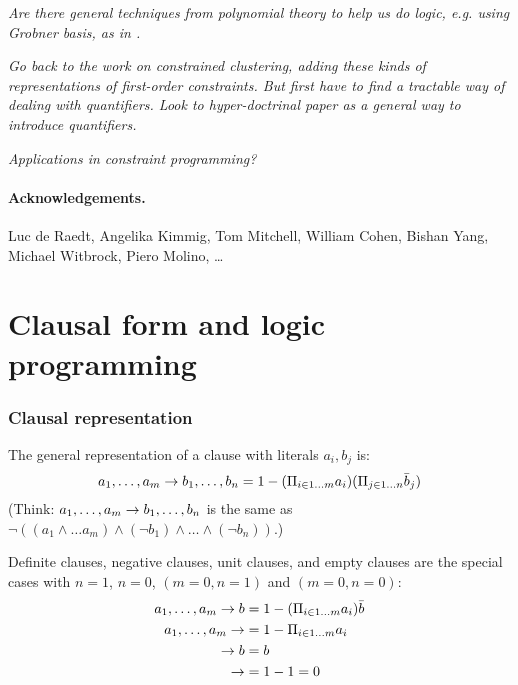 \documentclass{article} %
\begin{document}
{\em Are there general techniques from polynomial theory to help us do
  logic, e.g. using Grobner basis, as in \cite{Brickenstein:2009:PFG:1550968.1551286}.}

{\em Go back to the work on constrained clustering, adding these kinds
of representations of first-order constraints. But first have to find
a tractable way of dealing with quantifiers. Look to hyper-doctrinal paper as a general 
way to introduce quantifiers.}

{\em Applications in constraint programming?}

\paragraph{Acknowledgements.} Luc de Raedt, Angelika Kimmig, Tom Mitchell, William Cohen, Bishan Yang, Michael Witbrock, Piero Molino, \ldots




\appendix
\newpage

\section{Clausal form and logic programming}
\subsubsection{Clausal representation}
The general representation of a clause with literals $a_i,b_j$ is:
\begin{equation}
a_1,\ldots, a_m \rightarrow b_1, \ldots, b_n = 1-(\Pi_{i \in 1\ldots m} a_i)  (\Pi_{j\in 1\ldots n} \bar{b}_j)
\end{equation}
\noindent (Think: $a_1,\ldots, a_m \rightarrow b_1, \ldots, b_n$ is the same as $\neg ((a_1 \wedge \ldots a_m)
\wedge (\neg b_1) \wedge \ldots \wedge (\neg b_n))$.)

Definite clauses, negative clauses, unit clauses, and empty clauses are the special cases with 
$n=1$, $n=0$, $(m=0,n=1)$ and $(m=0,n=0)$: 
  \begin{align*}
    a_1,\ldots, a_m \rightarrow b &= 1-{(\Pi_{i \in 1\ldots m} a_i)  \bar{b}}\\
    a_1,\ldots, a_m \rightarrow &= 1-{\Pi_{i \in 1\ldots m} a_i}\\
    \rightarrow b &= b\\
    \rightarrow &= 1 - 1 = 0
  \end{align*}
\end{document}
